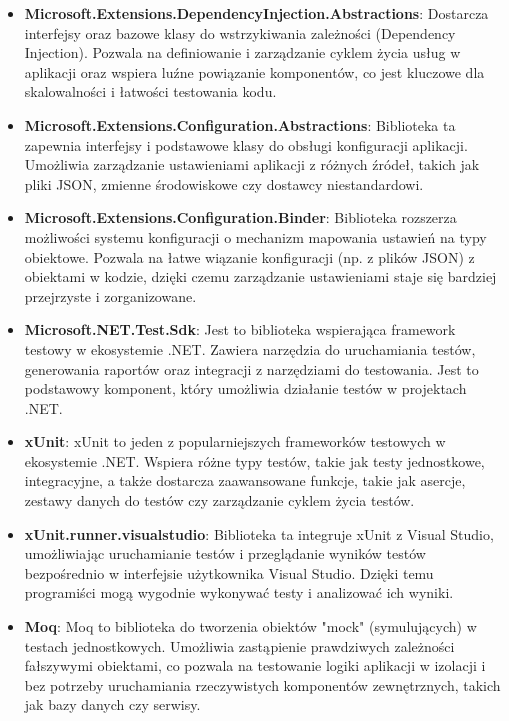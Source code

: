 \documentclass[12pt,a4paper]{article}
\begin{document}
\begin{itemize}
    \item \textbf{Microsoft.Extensions.DependencyInjection.Abstractions}: Dostarcza interfejsy oraz bazowe klasy do wstrzykiwania zależności (Dependency Injection). Pozwala na definiowanie i zarządzanie cyklem życia usług w aplikacji oraz wspiera luźne powiązanie komponentów, co jest kluczowe dla skalowalności i łatwości testowania kodu.
    \item \textbf{Microsoft.Extensions.Configuration.Abstractions}: Biblioteka ta zapewnia interfejsy i podstawowe klasy do obsługi konfiguracji aplikacji. Umożliwia zarządzanie ustawieniami aplikacji z różnych źródeł, takich jak pliki JSON, zmienne środowiskowe czy dostawcy niestandardowi.
    \item \textbf{Microsoft.Extensions.Configuration.Binder}: Biblioteka rozszerza możliwości systemu konfiguracji o mechanizm mapowania ustawień na typy obiektowe. Pozwala na łatwe wiązanie konfiguracji (np. z plików JSON) z obiektami w kodzie, dzięki czemu zarządzanie ustawieniami staje się bardziej przejrzyste i zorganizowane.

    \item \textbf{Microsoft.NET.Test.Sdk}: Jest to biblioteka wspierająca framework testowy w ekosystemie .NET. Zawiera narzędzia do uruchamiania testów, generowania raportów oraz integracji z narzędziami do testowania. Jest to podstawowy komponent, który umożliwia działanie testów w projektach .NET.
    \item \textbf{xUnit}: xUnit to jeden z popularniejszych frameworków testowych w ekosystemie .NET. Wspiera różne typy testów, takie jak testy jednostkowe, integracyjne, a także dostarcza zaawansowane funkcje, takie jak asercje, zestawy danych do testów czy zarządzanie cyklem życia testów.
    \item \textbf{xUnit.runner.visualstudio}: Biblioteka ta integruje xUnit z Visual Studio, umożliwiając uruchamianie testów i przeglądanie wyników testów bezpośrednio w interfejsie użytkownika Visual Studio. Dzięki temu programiści mogą wygodnie wykonywać testy i analizować ich wyniki.
    \item \textbf{Moq}: Moq to biblioteka do tworzenia obiektów "mock" (symulujących) w testach jednostkowych. Umożliwia zastąpienie prawdziwych zależności fałszywymi obiektami, co pozwala na testowanie logiki aplikacji w izolacji i bez potrzeby uruchamiania rzeczywistych komponentów zewnętrznych, takich jak bazy danych czy serwisy.
\end{itemize}

\newpage
\end{document}

